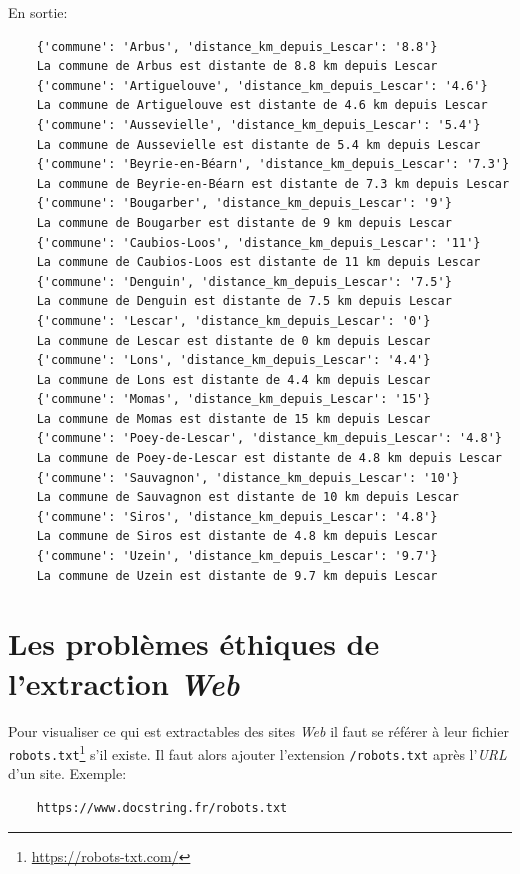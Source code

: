 \documentclass[a4paper,12pt]{book}
\begin{document}
En sortie:
\begin{verbatim}
    {'commune': 'Arbus', 'distance_km_depuis_Lescar': '8.8'}
    La commune de Arbus est distante de 8.8 km depuis Lescar
    {'commune': 'Artiguelouve', 'distance_km_depuis_Lescar': '4.6'}
    La commune de Artiguelouve est distante de 4.6 km depuis Lescar
    {'commune': 'Aussevielle', 'distance_km_depuis_Lescar': '5.4'}
    La commune de Aussevielle est distante de 5.4 km depuis Lescar
    {'commune': 'Beyrie-en-Béarn', 'distance_km_depuis_Lescar': '7.3'}
    La commune de Beyrie-en-Béarn est distante de 7.3 km depuis Lescar
    {'commune': 'Bougarber', 'distance_km_depuis_Lescar': '9'}
    La commune de Bougarber est distante de 9 km depuis Lescar
    {'commune': 'Caubios-Loos', 'distance_km_depuis_Lescar': '11'}
    La commune de Caubios-Loos est distante de 11 km depuis Lescar
    {'commune': 'Denguin', 'distance_km_depuis_Lescar': '7.5'}
    La commune de Denguin est distante de 7.5 km depuis Lescar
    {'commune': 'Lescar', 'distance_km_depuis_Lescar': '0'}
    La commune de Lescar est distante de 0 km depuis Lescar
    {'commune': 'Lons', 'distance_km_depuis_Lescar': '4.4'}
    La commune de Lons est distante de 4.4 km depuis Lescar
    {'commune': 'Momas', 'distance_km_depuis_Lescar': '15'}
    La commune de Momas est distante de 15 km depuis Lescar
    {'commune': 'Poey-de-Lescar', 'distance_km_depuis_Lescar': '4.8'}
    La commune de Poey-de-Lescar est distante de 4.8 km depuis Lescar
    {'commune': 'Sauvagnon', 'distance_km_depuis_Lescar': '10'}
    La commune de Sauvagnon est distante de 10 km depuis Lescar
    {'commune': 'Siros', 'distance_km_depuis_Lescar': '4.8'}
    La commune de Siros est distante de 4.8 km depuis Lescar
    {'commune': 'Uzein', 'distance_km_depuis_Lescar': '9.7'}
    La commune de Uzein est distante de 9.7 km depuis Lescar
\end{verbatim}
\medskip

\section{Les problèmes éthiques de l'extraction \textit{Web}}
Pour visualiser ce qui est extractables des sites \textit{Web} il faut se référer à leur fichier \texttt{robots.txt}\footnote{\url{https://robots-txt.com/}} s'il existe. Il faut alors ajouter l'extension \texttt{/robots.txt} après l'\textit{URL} d'un site. Exemple:
\begin{verbatim}
    https://www.docstring.fr/robots.txt
\end{verbatim}
\medskip
\end{document}
